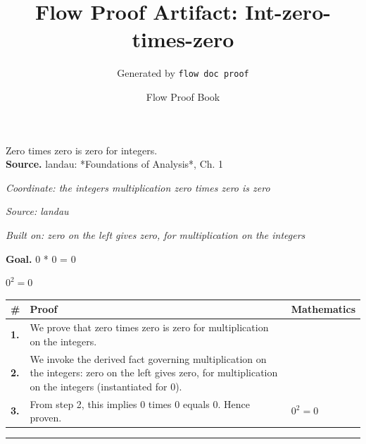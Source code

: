 \documentclass[11pt]{article}
\title{Flow Proof Artifact: Int-zero-times-zero}
\author{Generated by \texttt{flow doc proof}}
\date{Flow Proof Book}
\theoremstyle{definition}
\begin{document}
\maketitle
Zero times zero is zero for integers.\\[0.5em]
\textbf{Source.} landau: *Foundations of Analysis*, Ch. 1\\[0.5em]
\bigskip
{}\par
\smallskip\noindent\textit{Coordinate: the integers \cdot multiplication \cdot zero times zero is zero}\par
\smallskip\noindent\textit{Source: landau}\par
\smallskip\noindent\textit{Built on: zero on the left gives zero, for multiplication on the integers}\par
\medskip
\noindent\textbf{Goal.} 0 * 0 = 0\par
\noindent$\displaystyle 0^{2} = 0$\par
\medskip
\noindent
\begin{tabular}{@{} >{\raggedright\arraybackslash}p{} >{\raggedright\arraybackslash}p{} >{\raggedleft\arraybackslash}p{} @{}}
\textbf{\#} & \textbf{Proof} & \textbf{Mathematics} \\
\midrule
\textbf{1.} & We prove that zero times zero is zero for multiplication on the integers. & \\[0.45em]
\textbf{2.} & We invoke the derived fact governing multiplication on the integers: zero on the left gives zero, for multiplication on the integers (instantiated for 0). & \\[0.45em]
\textbf{3.} & From step 2, this implies 0 times 0 equals 0. Hence proven. & $\displaystyle 0^{2} = 0$ \\[0.45em]
\bottomrule
\end{tabular}
\label{thm:Int-multiplication-zero_times_zero_is_zero}
\par\medskip\hrule
\end{document}
